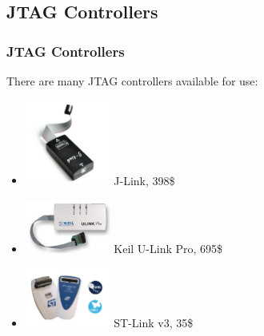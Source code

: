 \documentclass{beamer}
\begin{document}
\subsection{JTAG Controllers}
\begin{frame}[t]
    \frametitle{JTAG Controllers}
    There are many JTAG controllers available for use:
    \begin{itemize}
        \item \includegraphics[width=2.8cm,valign=c]{jlink.jpg} J-Link, 398\$
        \item \includegraphics[width=2.8cm,valign=c]{ulink.jpeg} Keil U-Link Pro, 695\$
        \item \includegraphics[width=2.8cm,valign=c]{stlink.jpg} ST-Link v3, 35\$
    \end{itemize}
\end{frame}
\end{document}
